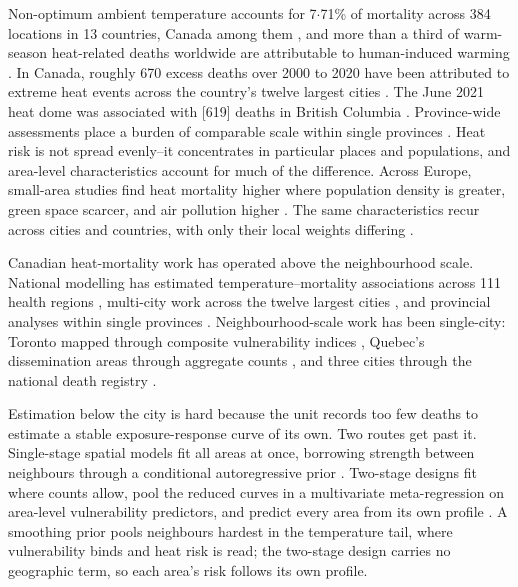 \documentclass[12pt]{article}
\begin{document}
Non-optimum ambient temperature accounts for 7$\cdot$71\% of
mortality across 384 locations in 13 countries, Canada among
them \citep{gasparrini2015mcc}, and more than a third of
warm-season heat-related deaths worldwide are attributable to
human-induced warming \citep{vicedocabrera2021}. In Canada,
roughly 670 excess deaths over 2000 to 2020 have been attributed
to extreme heat events across the country's twelve largest
cities \citep{quick2024twelvecities}. The June 2021 heat dome
was associated with [619] deaths in British Columbia
. Province-wide assessments place
a burden of comparable scale within single provinces
\citep{boudreault2024quebec}. Heat risk is not spread evenly–it
concentrates in particular places and populations, and
area-level characteristics account for much of the difference.
Across Europe, small-area studies find heat mortality higher
where population density is greater, green space scarcer, and
air pollution higher \citep{zhang2023cvdeurope,
zafeiratou2023respeurope}. The same characteristics recur across
cities and countries, with only their local weights differing
\citep{sera2019urban}.

Canadian heat-mortality work has operated above the
neighbourhood scale. National modelling has estimated
temperature--mortality associations across 111 health regions
\citep{hebbern2023}, multi-city work across the twelve largest
cities \citep{quick2024twelvecities}, and provincial analyses
within single provinces \citep{boudreault2024quebec,
chen2016ontario}. Neighbourhood-scale work has been single-city:
Toronto mapped through composite vulnerability indices
\citep{rinner2010}, Quebec's dissemination areas through
aggregate counts \citep{cote2024}, and three cities through the
national death registry \citep{quick2025smallarea}.

Estimation below the city is hard because the unit records too
few deaths to estimate a stable exposure-response curve of its
own. Two routes get past it. Single-stage spatial models fit all
areas at once, borrowing strength between neighbours through a
conditional autoregressive prior \citep{quijalzamorano2024sbdlnm,
rutten2026spatialvarying, rutten2026effectmod}. Two-stage
designs fit where counts allow, pool the reduced curves in a
multivariate meta-regression on area-level vulnerability
predictors, and predict every area from its own profile
\citep{gasparrini2022smallarea, sera2022extended,
dimaso2025italy, masselot2025extensions}. A smoothing prior
pools neighbours hardest in the temperature tail, where
vulnerability binds and heat risk is read; the two-stage design
carries no geographic term, so each area's risk follows its own
profile.
\end{document}
